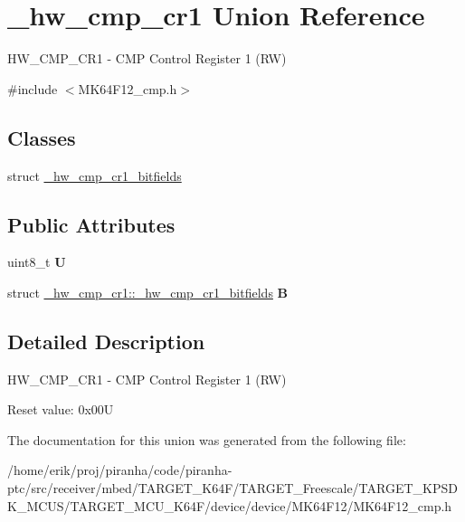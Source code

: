 \hypertarget{union__hw__cmp__cr1}{}\section{\+\_\+hw\+\_\+cmp\+\_\+cr1 Union Reference}
\label{union__hw__cmp__cr1}


H\+W\+\_\+\+C\+M\+P\+\_\+\+C\+R1 -\/ C\+MP Control Register 1 (RW)  




{\ttfamily \#include $<$M\+K64\+F12\+\_\+cmp.\+h$>$}

\subsection*{Classes}
\begin{DoxyCompactItemize}
\item 
struct \hyperlink{struct__hw__cmp__cr1_1_1__hw__cmp__cr1__bitfields}{\+\_\+hw\+\_\+cmp\+\_\+cr1\+\_\+bitfields}
\end{DoxyCompactItemize}
\subsection*{Public Attributes}
\begin{DoxyCompactItemize}
\item 
uint8\+\_\+t {\bfseries U}\hypertarget{union__hw__cmp__cr1_a1cd6337c3de3c19944203cd13c3959a8}{}\label{union__hw__cmp__cr1_a1cd6337c3de3c19944203cd13c3959a8}

\item 
struct \hyperlink{struct__hw__cmp__cr1_1_1__hw__cmp__cr1__bitfields}{\+\_\+hw\+\_\+cmp\+\_\+cr1\+::\+\_\+hw\+\_\+cmp\+\_\+cr1\+\_\+bitfields} {\bfseries B}\hypertarget{union__hw__cmp__cr1_ab09e2c04b5b623cdc6de820dcdd9b27f}{}\label{union__hw__cmp__cr1_ab09e2c04b5b623cdc6de820dcdd9b27f}

\end{DoxyCompactItemize}


\subsection{Detailed Description}
H\+W\+\_\+\+C\+M\+P\+\_\+\+C\+R1 -\/ C\+MP Control Register 1 (RW) 

Reset value\+: 0x00U 

The documentation for this union was generated from the following file\+:\begin{DoxyCompactItemize}
\item 
/home/erik/proj/piranha/code/piranha-\/ptc/src/receiver/mbed/\+T\+A\+R\+G\+E\+T\+\_\+\+K64\+F/\+T\+A\+R\+G\+E\+T\+\_\+\+Freescale/\+T\+A\+R\+G\+E\+T\+\_\+\+K\+P\+S\+D\+K\+\_\+\+M\+C\+U\+S/\+T\+A\+R\+G\+E\+T\+\_\+\+M\+C\+U\+\_\+\+K64\+F/device/device/\+M\+K64\+F12/M\+K64\+F12\+\_\+cmp.\+h\end{DoxyCompactItemize}
